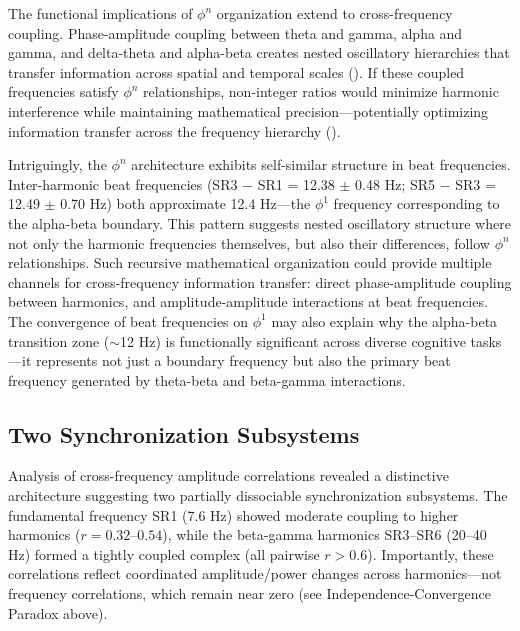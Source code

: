 \documentclass[11pt,a4paper]{article}
\begin{document}
The functional implications of $\phi^n$ organization extend to cross-frequency coupling. Phase-amplitude coupling between theta and gamma, alpha and gamma, and delta-theta and alpha-beta creates nested oscillatory hierarchies that transfer information across spatial and temporal scales (\cite{canolty2010role, jensen2007crossfrequency}). If these coupled frequencies satisfy $\phi^n$ relationships, non-integer ratios would minimize harmonic interference while maintaining mathematical precision—potentially optimizing information transfer across the frequency hierarchy (\cite{bonnefond2017communication}).

Intriguingly, the $\phi^n$ architecture exhibits self-similar structure in beat frequencies. Inter-harmonic beat frequencies (SR3 $-$ SR1 = 12.38 $\pm$ 0.48 Hz; SR5 $-$ SR3 = 12.49 $\pm$ 0.70 Hz) both approximate 12.4 Hz—the $\phi^1$ frequency corresponding to the alpha-beta boundary. This pattern suggests nested oscillatory structure where not only the harmonic frequencies themselves, but also their differences, follow $\phi^n$ relationships. Such recursive mathematical organization could provide multiple channels for cross-frequency information transfer: direct phase-amplitude coupling between harmonics, and amplitude-amplitude interactions at beat frequencies. The convergence of beat frequencies on $\phi^1$ may also explain why the alpha-beta transition zone ($\sim$12 Hz) is functionally significant across diverse cognitive tasks—it represents not just a boundary frequency but also the primary beat frequency generated by theta-beta and beta-gamma interactions.

\subsection{Two Synchronization Subsystems}

Analysis of cross-frequency amplitude correlations revealed a distinctive architecture suggesting two partially dissociable synchronization subsystems. The fundamental frequency SR1 (7.6 Hz) showed moderate coupling to higher harmonics ($r = 0.32$–$0.54$), while the beta-gamma harmonics SR3–SR6 (20–40 Hz) formed a tightly coupled complex (all pairwise $r > 0.6$). Importantly, these correlations reflect coordinated amplitude/power changes across harmonics—not frequency correlations, which remain near zero (see Independence-Convergence Paradox above).
\end{document}
